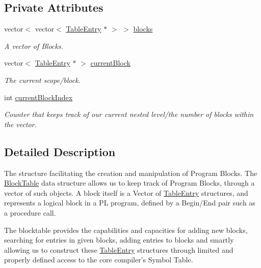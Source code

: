 \subsection*{Private Attributes}
\begin{DoxyCompactItemize}
\item 
vector$<$ vector$<$ \hyperlink{structTableEntry}{TableEntry} $\ast$ $>$ $>$ \hyperlink{classBlockTable_a218731f3bdcdcc1aefe6f7e040693e39}{blocks}
\begin{DoxyCompactList}\small\item\em A vector of Blocks. \item\end{DoxyCompactList}\item 
vector$<$ \hyperlink{structTableEntry}{TableEntry} $\ast$ $>$ \hyperlink{classBlockTable_a6a762febfc7063228de04cdd6b3490cb}{currentBlock}
\begin{DoxyCompactList}\small\item\em The current scope/block. \item\end{DoxyCompactList}\item 
int \hyperlink{classBlockTable_a88b835ac538211364f1bd369edb5d1f3}{currentBlockIndex}
\begin{DoxyCompactList}\small\item\em Counter that keeps track of our current nested level/the number of blocks within the vector. \item\end{DoxyCompactList}\end{DoxyCompactItemize}


\subsection{Detailed Description}
The structure facilitating the creation and manipulation of Program Blocks. The \hyperlink{classBlockTable}{BlockTable} data structure allows us to keep track of Program Blocks, through a vector of such objects. A block itself is a Vector of \hyperlink{structTableEntry}{TableEntry} structures, and represents a logical block in a PL program, defined by a Begin/End pair such as a procedure call.

The blocktable provides the capabilities and capacities for adding new blocks, searching for entries in given blocks, adding entries to blocks and smartly allowing us to construct these \hyperlink{structTableEntry}{TableEntry} structures through limited and properly defined access to the core compiler's Symbol Table. 


